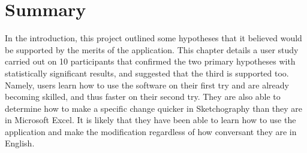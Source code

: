 \section{Summary}
In the introduction, this project outlined some hypotheses that it believed would be supported by the merits of the application. This chapter details a user study carried out on 10 participants that confirmed the two primary hypotheses with statistically significant results, and suggested that the third is supported too. Namely, users learn how to use the software on their first try and are already becoming skilled, and thus faster on their second try. They are also able to determine how to make a specific change quicker in Sketchography than they are in Microsoft Excel. It is likely that they have been able to learn how to use the application and make the modification regardless of how conversant they are in English.